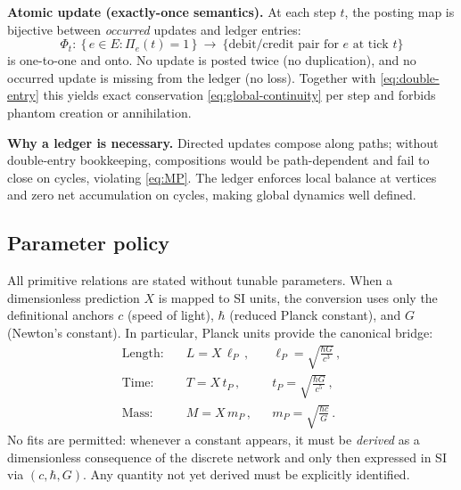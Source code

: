 \documentclass[11pt]{article}
\theoremstyle{definition}
\theoremstyle{remark}
\begin{document}
\medskip
\textbf{Atomic update (exactly-once semantics).}
At each step \(t\), the posting map is bijective between \emph{occurred} updates and ledger entries:
\begin{equation}
\label{eq:atomic-tick}
\Phi_t:\ \{\,e\in E:\Pi_e(t)=1\,\}\ \longrightarrow\ \{\text{debit/credit pair for }e\text{ at tick }t\}
\end{equation}
is one-to-one and onto. No update is posted twice (no duplication), and no occurred update is missing from the ledger (no loss). Together with \eqref{eq:double-entry} this yields exact conservation \eqref{eq:global-continuity} per step and forbids phantom creation or annihilation.

\medskip
\textbf{Why a ledger is necessary.}
Directed updates compose along paths; without double-entry bookkeeping, compositions would be path-dependent and fail to close on cycles, violating \eqref{eq:MP}. The ledger enforces local balance at vertices and zero net accumulation on cycles, making global dynamics well defined.

\subsection{Parameter policy}

All primitive relations are stated without tunable parameters. When a dimensionless prediction \(X\) is mapped to SI units, the conversion uses only the definitional anchors \(c\) (speed of light), \(\hbar\) (reduced Planck constant), and \(G\) (Newton’s constant). In particular, Planck units provide the canonical bridge:
\begin{align}
\text{Length:}\quad & L = X\,\ell_P\,, && \ell_P=\sqrt{\frac{\hbar G}{c^{3}}}\,,\\
\text{Time:}\quad & T = X\,t_P\,, && t_P=\sqrt{\frac{\hbar G}{c^{5}}}\,,\\
\text{Mass:}\quad & M = X\,m_P\,, && m_P=\sqrt{\frac{\hbar c}{G}}\,.
\end{align}
No fits are permitted: whenever a constant appears, it must be \emph{derived} as a dimensionless consequence of the discrete network and only then expressed in SI via \((c,\hbar,G)\). Any quantity not yet derived must be explicitly identified.

\end{document}
